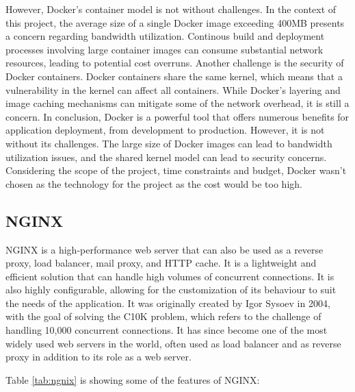 However, Docker's container model is not without challenges. In the context of this project, the average size of a single Docker image exceeding 400MB presents a concern regarding bandwidth utilization. Continous build and deployment processes involving large container images can consume substantial network resources, leading to potential cost overruns. \cite{merkel2014docker}
Another challenge is the security of Docker containers. Docker containers share the same kernel, which means that a vulnerability in the kernel can affect all containers. \cite{dockerhub}
While Docker's layering and image caching mechanisms can mitigate some of the network overhead, it is still a concern.
In conclusion, Docker is a powerful tool that offers numerous benefits for application deployment, from development to production. However, it is not without its challenges. The large size of Docker images can lead to bandwidth utilization issues, and the shared kernel model can lead to security concerns. Considering the scope of the project, time constraints and budget, Docker wasn't chosen as the technology for the project as the cost would be too high.


\subsection{NGINX}
NGINX is a high-performance web server that can also be used as a reverse proxy, load balancer, mail proxy, and HTTP cache. It is a lightweight and efficient solution that can handle high volumes of concurrent connections. It is also highly configurable, allowing for the customization of its behaviour to suit the needs of the application.
It was originally created by Igor Sysoev in 2004, with the goal of solving the C10K problem, which refers to the challenge of handling 10,000 concurrent connections. \cite{nginx} It has since become one of the most widely used web servers in the world, often used as load balancer and as reverse proxy in addition to its role as a web server.

Table \ref{tab:ngnix} is showing some of the features of NGINX\cite{nginx}:

